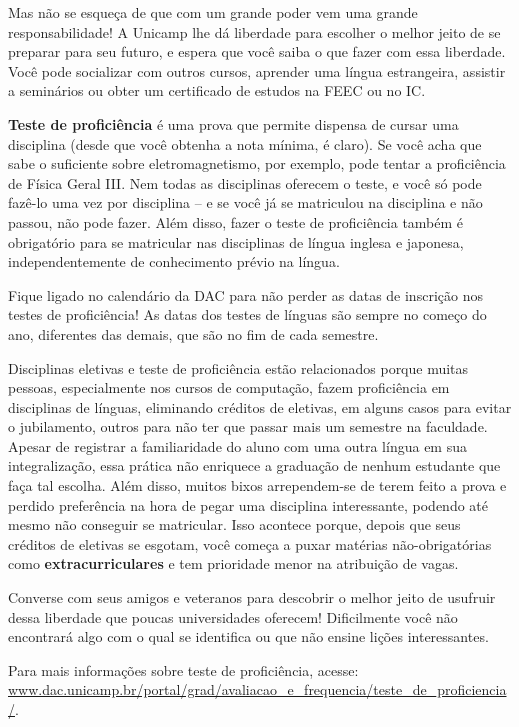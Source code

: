 Mas não se esqueça de que com um grande poder vem uma grande responsabilidade!
A Unicamp lhe dá liberdade para escolher o melhor jeito de se preparar para seu
futuro, e espera que você saiba o que fazer com essa liberdade. Você pode socializar com
outros cursos, aprender uma língua estrangeira, assistir a seminários ou obter
um certificado de estudos na FEEC ou no IC.

\textbf{Teste de proficiência} é uma prova que permite dispensa de cursar uma disciplina
(desde que você obtenha a nota mínima, é claro). Se você acha que sabe o suficiente
sobre eletromagnetismo, por exemplo, pode tentar a proficiência de Física Geral III.
Nem todas as disciplinas oferecem o teste, e você só pode fazê-lo uma vez por
disciplina -- e se você já se matriculou na disciplina e não passou, não pode fazer.
Além disso, fazer o teste de proficiência também é obrigatório para se matricular
nas disciplinas de língua inglesa e japonesa, independentemente de conhecimento
prévio na língua.

Fique ligado no calendário da DAC para não perder as datas de inscrição nos
testes de proficiência! As datas dos testes de línguas são sempre no começo do
ano, diferentes das demais, que são no fim de cada semestre.

Disciplinas eletivas e teste de proficiência estão relacionados porque muitas pessoas,
especialmente nos cursos de computação, fazem proficiência em
disciplinas de línguas, eliminando créditos de eletivas, em alguns casos para evitar o jubilamento, outros para não ter que
passar mais um semestre na faculdade. Apesar de registrar a familiaridade do
aluno com uma outra língua em sua integralização, essa prática não enriquece
a graduação de nenhum estudante que faça tal escolha. Além disso, muitos bixos
arrependem-se de terem feito a prova e perdido preferência na hora de pegar uma
disciplina interessante, podendo até mesmo não conseguir se matricular. Isso acontece
porque, depois que seus créditos de eletivas se esgotam, você começa a puxar matérias
não-obrigatórias como \textbf{extracurriculares} e tem prioridade menor na
atribuição de vagas.

Converse com seus amigos e veteranos para descobrir o melhor jeito de usufruir
dessa liberdade que poucas universidades oferecem! Dificilmente você não
encontrará algo com o qual se identifica ou que não ensine lições interessantes.

Para mais informações sobre teste de proficiência, acesse:
\url{www.dac.unicamp.br/portal/grad/avaliacao_e_frequencia/teste_de_proficiencia/}.

